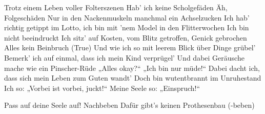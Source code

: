 \begin{guitar}
	 
	
	Trotz einem Leben voller Folterszenen
	Hab' ich keine Scholgefäden
	Äh, Folgeschäden
	Nur in den Nackenmuskeln manchmal ein Achselzucken
	Ich hab' richtig getippt im Lotto, ich bin mit 'nem Model in den Flitterwochen
	Ich bin nicht beeindruckt
	Ich sitz' auf Kosten, vom Blitz getroffen, Genick gebrochen
	Alles kein Beinbruch (True)
	Und wie ich so mit leerem Blick über Dinge grübel'
	Bemerk' ich auf einmal, dass ich mein Kind verprügel'
	Und dabei Geräusche mache wie ein Pinscher-Rüde
	„Alles okay?“ „Ich bin nur müde!“
	Dabei dacht ich, dass sich mein Leben zum Guten wandt'
	Doch bin wutentbrannt im Unruhestand
	Ich so: „Vorbei ist vorbei, juckt!“
	Meine Seele so: „Einspruch!“
	
	 
	
	Pass auf deine Seele auf! Nachbeben
	Dafür gibt's keinen Prothesenbau (-beben)
\end{guitar}